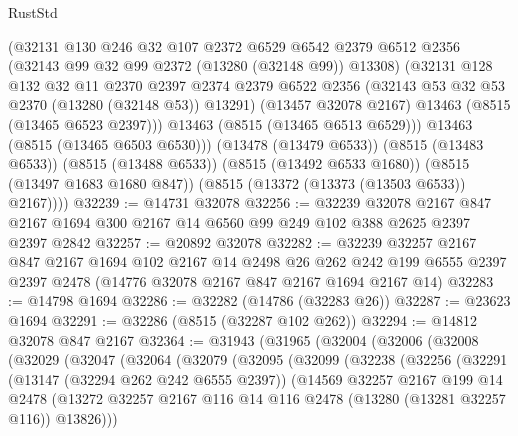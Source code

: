 \begin{lexlean}{RustStd}
\begin{coremodule}
          (@32131
            @130
            @246
            @32
            @107
            @2372
            @6529
            @6542
            @2379
            @6512
            @2356
            (@32143 @99 @32 @99 @2372 (@13280 (@32148 @99)) @13308)
            (@32131
              @128
              @132
              @32
              @11
              @2370
              @2397
              @2374
              @2379
              @6522
              @2356
              (@32143 @53 @32 @53 @2370 (@13280 (@32148 @53)) @13291)
              (@13457 @32078 @2167)
              @13463
              (@8515 (@13465 @6523 @2397)))
            @13463
            (@8515 (@13465 @6513 @6529)))
          @13463
          (@8515 (@13465 @6503 @6530)))
        (@13478 (@13479 @6533))
        (@8515 (@13483 @6533))
        (@8515 (@13488 @6533))
        (@8515 (@13492 @6533 @1680))
        (@8515 (@13497 @1683 @1680 @847))
        (@8515 (@13372 (@13373 (@13503 @6533)) @2167))))
@32239 := @14731 @32078
@32256 := @32239
    @32078
    @2167
    @847
    @2167
    @1694
    @300
    @2167
    @14
    @6560
    @99
    @249
    @102
    @388
    @2625
    @2397
    @2397
    @2842
@32257 := @20892 @32078
@32282 := @32239
    @32257
    @2167
    @847
    @2167
    @1694
    @102
    @2167
    @14
    @2498
    @26
    @262
    @242
    @199
    @6555
    @2397
    @2397
    @2478
    (@14776 @32078 @2167 @847 @2167 @1694 @2167 @14)
@32283 := @14798 @1694
@32286 := @32282 (@14786 (@32283 @26))
@32287 := @23623 @1694
@32291 := @32286 (@8515 (@32287 @102 @262))
@32294 := @14812 @32078 @847 @2167
@32364 := @31943
    (@31965
      (@32004
        (@32006
          (@32008
            (@32029
              (@32047
                (@32064
                  (@32079
                    (@32095
                      (@32099
                        (@32238
                          (@32256
                            (@32291
                              (@13147 (@32294 @262 @242 @6555 @2397))
                              (@14569
                                @32257
                                @2167
                                @199
                                @14
                                @2478
                                (@13272
                                  @32257
                                  @2167
                                  @116
                                  @14
                                  @116
                                  @2478
                                  (@13280 (@13281 @32257 @116))
                                  @13826)))

\end{coremodule}
\end{lexlean}
